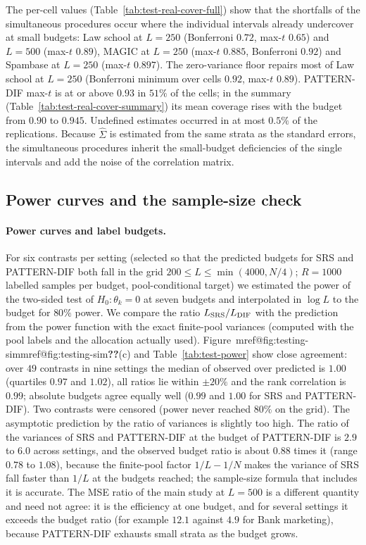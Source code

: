\documentclass[pdflatex,sn-mathphys-num,iicol]{sn-jnl}
\makeatletter
\theoremstyle{thmstyleone}
\theoremstyle{thmstyletwo}
\theoremstyle{thmstylethree}
\newcommand{\Mref}[1]{\ifcsname mref@#1\endcsname\csname mref@#1\endcsname\else\textbf{??}\fi}
\makeatother
\begin{document}
The per-cell values (Table~\ref{tab:test-real-cover-full}) show that the shortfalls of the simultaneous procedures occur where the individual intervals already undercover at small budgets: Law school at $L=250$ (Bonferroni $0.72$, max-$t$ $0.65$) and $L=500$ (max-$t$ $0.89$), MAGIC at $L=250$ (max-$t$ $0.885$, Bonferroni $0.92$) and Spambase at $L=250$ (max-$t$ $0.897$). The zero-variance floor repairs most of Law school at $L=250$ (Bonferroni minimum over cells $0.92$, max-$t$ $0.89$). PATTERN-DIF max-$t$ is at or above $0.93$ in $51\%$ of the cells; in the summary (Table~\ref{tab:test-real-cover-summary}) its mean coverage rises with the budget from $0.90$ to $0.945$. Undefined estimates occurred in at most $0.5\%$ of the replications. Because $\hat\Sigma$ is estimated from the same strata as the standard errors, the simultaneous procedures inherit the small-budget deficiencies of the single intervals and add the noise of the correlation matrix.

\subsection{Power curves and the sample-size check}

\paragraph{Power curves and label budgets.} For six contrasts per setting (selected so that the predicted budgets for SRS and PATTERN-DIF both fall in the grid $200\le L\le\min(4000,N/4)$; $R=1000$ labelled samples per budget, pool-conditional target) we estimated the power of the two-sided test of $H_0:\theta_k=0$ at seven budgets and interpolated in $\log L$ to the budget for $80\%$ power. We compare the ratio $L_{\rm SRS}/L_{\rm DIF}$ with the prediction from the power function with the exact finite-pool variances (computed with the pool labels and the allocation actually used). Figure~\Mref{fig:testing-sim}(c) and Table~\ref{tab:test-power} show close agreement: over $49$ contrasts in nine settings the median of observed over predicted is $1.00$ (quartiles $0.97$ and $1.02$), all ratios lie within $\pm20\%$ and the rank correlation is $0.99$; absolute budgets agree equally well ($0.99$ and $1.00$ for SRS and PATTERN-DIF). Two contrasts were censored (power never reached $80\%$ on the grid). The asymptotic prediction by the ratio of variances is slightly too high. The ratio of the variances of SRS and PATTERN-DIF at the budget of PATTERN-DIF is $2.9$ to $6.0$ across settings, and the observed budget ratio is about $0.88$ times it (range $0.78$ to $1.08$), because the finite-pool factor $1/L-1/N$ makes the variance of SRS fall faster than $1/L$ at the budgets reached; the sample-size formula that includes it is accurate. The MSE ratio of the main study at $L=500$ is a different quantity and need not agree: it is the efficiency at one budget, and for several settings it exceeds the budget ratio (for example $12.1$ against $4.9$ for Bank marketing), because PATTERN-DIF exhausts small strata as the budget grows.
\end{document}
